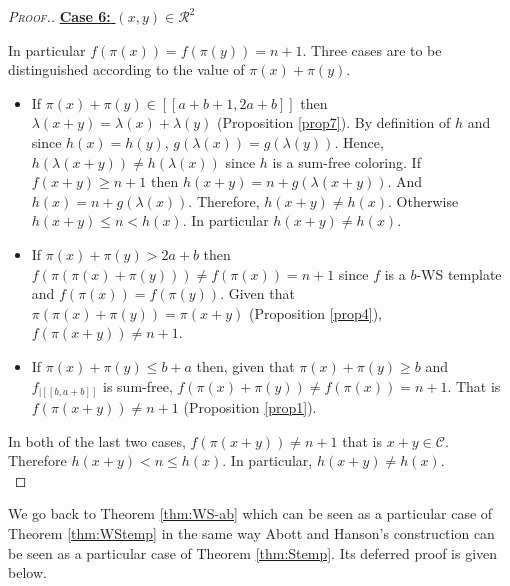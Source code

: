 \begin{proof}[\textsc{Proof.}]
\noindent \underline{\textbf{Case 6:} \((x,y) \in \mathcal{R}^2\)}
\par
In particular \(f(\pi(x)) = f(\pi(y))=n + 1\). Three cases are to be distinguished according to the value of \(\pi(x) + \pi(y)\).
\begin{itemize}
\item If \(\pi(x) + \pi(y) \in [\![a + b + 1, 2 a + b]\!]\) then \(\lambda(x + y) = \lambda(x) + \lambda(y)\)
	(Proposition \ref{prop7}). By definition of \(h\) and since \(h(x) = h(y)\), \(g(\lambda(x)) = g(\lambda(y))\).
	Hence, \(h(\lambda(x + y)) \neq h(\lambda(x))\) since \(h\) is a sum-free coloring. If \(f(x+y) \geqslant n + 1\)
	then \(h(x + y) = n + g(\lambda(x + y))\). And \(h(x) = n + g(\lambda(x))\). Therefore, \(h(x + y)  \neq h(x)\).
	Otherwise \(h(x+y) \leqslant n < h(x)\). In particular \(h(x + y) \neq h(x)\).
\item If \(\pi(x)+\pi(y)>2a+b\) then \(f(\pi(\pi(x)+\pi(y))) \neq f(\pi(x)) = n + 1\) since \(f\) is a \(b\)-WS template and
	\(f(\pi(x)) = f(\pi(y))\). Given that \(\pi(\pi(x)+\pi(y)) = \pi(x+y)\) (Proposition \ref{prop4}), \(f(\pi(x+y)) \neq n + 1\).
\item \begin{sloppypar}
	If \(\pi(x)+\pi(y)\leqslant b+a\) then, given that \(\pi(x)+\pi(y) \geqslant b\) and \(f_{| [\![b, a + b ]\!]}\) is
	sum-free, \({f(\pi(x) + \pi(y)) \neq f(\pi(x)) = n + 1}\). That is \({f(\pi(x + y)) \neq n + 1}\) (Proposition \ref{prop1}).
	\end{sloppypar}
\end{itemize}
\par
In both of the last two cases, \({f(\pi(x + y)) \neq n + 1}\) that is \(x+y \in \mathcal{C}\). Therefore \(h(x+y) < n \leqslant h(x)\).
In particular, \(h(x + y) \neq h(x)\). \\
\end{proof}

We go back to Theorem \ref{thm:WS-ab} which can be seen as a particular case of Theorem \ref{thm:WStemp} in the same way Abott and Hanson's 
construction \cite{AbbottHanson} can be seen as a particular case of Theorem \ref{thm:Stemp}. Its deferred proof is given below.

